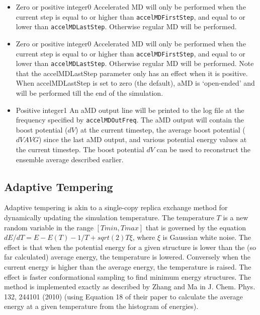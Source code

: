 \begin{itemize}
\item
{}
{Zero or positive integer}{0}
{Accelerated MD will only be performed when the current step is equal to or higher than {\tt accelMDFirstStep}, and equal to or lower than {\tt accelMDLastStep}. Otherwise regular MD will be performed.
}
\item
{}
{Zero or positive integer}{0}
{Accelerated MD will only be performed when the current step is equal to or higher than {\tt accelMDFirstStep}, and equal to or lower than {\tt accelMDLastStep}. Otherwise regular MD will be performed. Note that the accelMDLastStep parameter only has an effect when it is positive. When accelMDLastStep is set to zero (the default), aMD is `open-ended' and will be performed
till the end of the simulation. 
}

\item
{}
{Positive integer}{1}
{An aMD output line will be printed to the log file at the frequency specified by {\tt accelMDOutFreq}.
The aMD output will contain the boost potential ($dV$) at the current timestep, 
the average boost potential ($dVAVG$) since the last aMD output, and various potential energy values at the current timestep.
The boost potential $dV$ can be used to reconstruct the ensemble average described earlier.
}

\end{itemize}

\subsection{Adaptive Tempering}
\label{section:adapttemp}
Adaptive tempering is akin to a single-copy replica exchange method for dynamically updating the simulation temperature. The temperature $T$ is a new random variable in the range $[Tmin,Tmax]$ that is governed by the equation $dE/dT = E-E(T)-1/T+sqrt(2)T\xi$, where $\xi$ is Gaussian white noise. The effect is that when the potential energy for a given structure is lower than the (so far calculated) average energy, the temperature is lowered. Conversely when the current energy is higher than the average energy, the temperature is raised. The effect is faster conformational sampling to find minimum energy structures. The method is implemented exactly as described by Zhang and Ma in J. Chem. Phys. 132, 244101 (2010) (using Equation 18 of their paper to calculate the average energy at a given temperature from the histogram of energies). 

